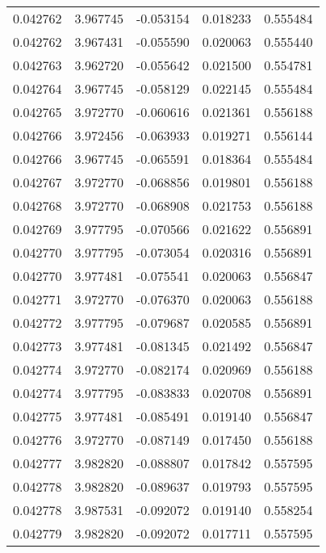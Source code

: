 \begin{tabular}{lrrrr}
0.042762    &  3.967745 & -0.053154 &  0.018233 &             0.555484 \\
0.042762    &  3.967431 & -0.055590 &  0.020063 &             0.555440 \\
0.042763    &  3.962720 & -0.055642 &  0.021500 &             0.554781 \\
0.042764    &  3.967745 & -0.058129 &  0.022145 &             0.555484 \\
0.042765    &  3.972770 & -0.060616 &  0.021361 &             0.556188 \\
0.042766    &  3.972456 & -0.063933 &  0.019271 &             0.556144 \\
0.042766    &  3.967745 & -0.065591 &  0.018364 &             0.555484 \\
0.042767    &  3.972770 & -0.068856 &  0.019801 &             0.556188 \\
0.042768    &  3.972770 & -0.068908 &  0.021753 &             0.556188 \\
0.042769    &  3.977795 & -0.070566 &  0.021622 &             0.556891 \\
0.042770    &  3.977795 & -0.073054 &  0.020316 &             0.556891 \\
0.042770    &  3.977481 & -0.075541 &  0.020063 &             0.556847 \\
0.042771    &  3.972770 & -0.076370 &  0.020063 &             0.556188 \\
0.042772    &  3.977795 & -0.079687 &  0.020585 &             0.556891 \\
0.042773    &  3.977481 & -0.081345 &  0.021492 &             0.556847 \\
0.042774    &  3.972770 & -0.082174 &  0.020969 &             0.556188 \\
0.042774    &  3.977795 & -0.083833 &  0.020708 &             0.556891 \\
0.042775    &  3.977481 & -0.085491 &  0.019140 &             0.556847 \\
0.042776    &  3.972770 & -0.087149 &  0.017450 &             0.556188 \\
0.042777    &  3.982820 & -0.088807 &  0.017842 &             0.557595 \\
0.042778    &  3.982820 & -0.089637 &  0.019793 &             0.557595 \\
0.042778    &  3.987531 & -0.092072 &  0.019140 &             0.558254 \\
0.042779    &  3.982820 & -0.092072 &  0.017711 &             0.557595 \\

\end{tabular}

